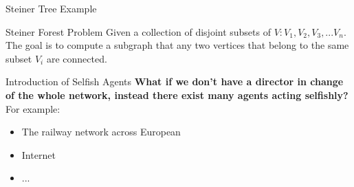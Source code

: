\documentclass[11pt,aspectratio=169]{beamer}
\begin{document}
\begin{frame}{Steiner Tree Example}
\end{frame}

\begin{frame}{Steiner Forest Problem}
 Given a collection of disjoint subsets of \(V: V_1,V_2,V_3,...V_n\). The goal is to compute a subgraph that any two vertices that belong to the same subset \(V_i\) are connected.
\end{frame}

\begin{frame}{Introduction of Selfish Agents}
\textbf{What if we don't have a director in change of the whole network, instead there exist many agents acting selfishly?}\\
\vspace{10pt}
For example:
\begin{itemize}
    \item The railway network across European
    \item Internet
    \item ...
\end{itemize}
\end{frame}
\end{document}
